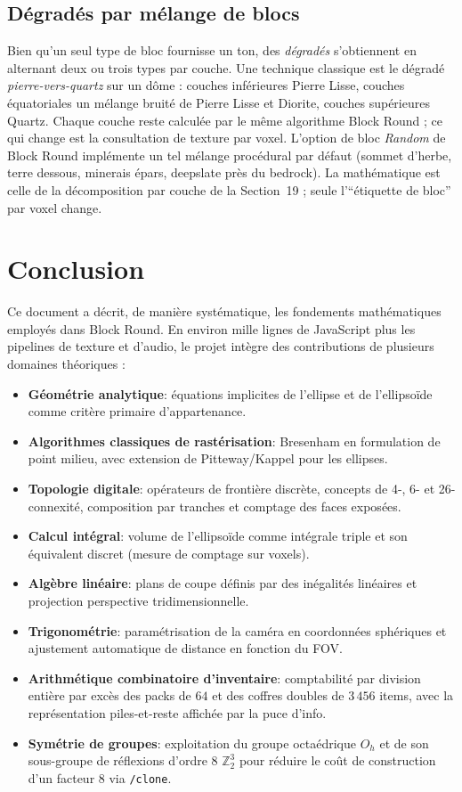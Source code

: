 \documentclass[12pt,a4paper]{scrartcl}
\newcommand{\acc}[1]{\textcolor{accent}{\textbf{#1}}}
\newcommand{\cmd}[1]{\textcolor{earth}{\texttt{\small #1}}}
\begin{document}
\subsection{Dégradés par mélange de blocs}
Bien qu'un seul type de bloc fournisse un ton, des \emph{dégradés} s'obtiennent en alternant deux ou trois types par couche. Une technique classique est le dégradé \emph{pierre-vers-quartz} sur un dôme : couches inférieures Pierre Lisse, couches équatoriales un mélange bruité de Pierre Lisse et Diorite, couches supérieures Quartz. Chaque couche reste calculée par le même algorithme Block Round ; ce qui change est la consultation de texture par voxel. L'option de bloc \emph{Random} de Block Round implémente un tel mélange procédural par défaut (sommet d'herbe, terre dessous, minerais épars, deepslate près du bedrock). La mathématique est celle de la décomposition par couche de la Section~19 ; seule l'\enquote{étiquette de bloc} par voxel change.

\section{Conclusion}

Ce document a décrit, de manière systématique, les fondements mathématiques employés dans Block Round. En environ mille lignes de JavaScript plus les pipelines de texture et d'audio, le projet intègre des contributions de plusieurs domaines théoriques :

\begin{itemize}[leftmargin=1.3em,itemsep=0.25em,topsep=0.4em]
  \item \acc{Géométrie analytique}: équations implicites de l'ellipse et de l'ellipsoïde comme critère primaire d'appartenance.
  \item \acc{Algorithmes classiques de rastérisation}: Bresenham en formulation de point milieu, avec extension de Pitteway/Kappel pour les ellipses.
  \item \acc{Topologie digitale}: opérateurs de frontière discrète, concepts de 4-, 6- et 26-connexité, composition par tranches et comptage des faces exposées.
  \item \acc{Calcul intégral}: volume de l'ellipsoïde comme intégrale triple et son équivalent discret (mesure de comptage sur voxels).
  \item \acc{Algèbre linéaire}: plans de coupe définis par des inégalités linéaires et projection perspective tridimensionnelle.
  \item \acc{Trigonométrie}: paramétrisation de la caméra en coordonnées sphériques et ajustement automatique de distance en fonction du FOV.
  \item \acc{Arithmétique combinatoire d'inventaire}: comptabilité par division entière par excès des packs de $64$ et des coffres doubles de $3\,456$ items, avec la représentation piles-et-reste affichée par la puce d'info.
  \item \acc{Symétrie de groupes}: exploitation du groupe octaédrique $O_h$ et de son sous-groupe de réflexions d'ordre $8$ $\mathbb{Z}_2^3$ pour réduire le coût de construction d'un facteur $8$ via \cmd{/clone}.
\end{itemize}
\end{document}
